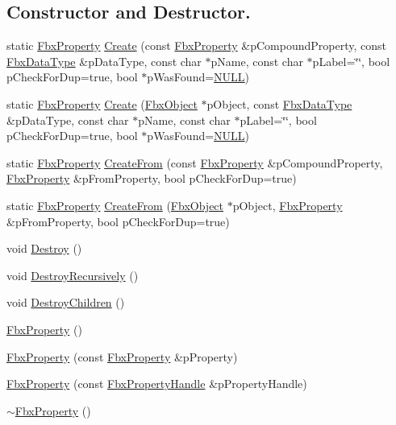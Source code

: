 \subsection*{Constructor and Destructor.}
\begin{DoxyCompactItemize}
\item 
static \hyperlink{class_fbx_property}{Fbx\+Property} \hyperlink{class_fbx_property_ae4aff3fdfa579d96a06f3f025d710e36}{Create} (const \hyperlink{class_fbx_property}{Fbx\+Property} \&p\+Compound\+Property, const \hyperlink{class_fbx_data_type}{Fbx\+Data\+Type} \&p\+Data\+Type, const char $\ast$p\+Name, const char $\ast$p\+Label=\char`\"{}\char`\"{}, bool p\+Check\+For\+Dup=true, bool $\ast$p\+Was\+Found=\hyperlink{fbxarch_8h_a070d2ce7b6bb7e5c05602aa8c308d0c4}{N\+U\+LL})
\item 
static \hyperlink{class_fbx_property}{Fbx\+Property} \hyperlink{class_fbx_property_ae08139931825dd529057d67812928622}{Create} (\hyperlink{class_fbx_object}{Fbx\+Object} $\ast$p\+Object, const \hyperlink{class_fbx_data_type}{Fbx\+Data\+Type} \&p\+Data\+Type, const char $\ast$p\+Name, const char $\ast$p\+Label=\char`\"{}\char`\"{}, bool p\+Check\+For\+Dup=true, bool $\ast$p\+Was\+Found=\hyperlink{fbxarch_8h_a070d2ce7b6bb7e5c05602aa8c308d0c4}{N\+U\+LL})
\item 
static \hyperlink{class_fbx_property}{Fbx\+Property} \hyperlink{class_fbx_property_a333f52b93aca2083c6de7541a3911a65}{Create\+From} (const \hyperlink{class_fbx_property}{Fbx\+Property} \&p\+Compound\+Property, \hyperlink{class_fbx_property}{Fbx\+Property} \&p\+From\+Property, bool p\+Check\+For\+Dup=true)
\item 
static \hyperlink{class_fbx_property}{Fbx\+Property} \hyperlink{class_fbx_property_a3a80022746dbee36a37eed53aa19dbe0}{Create\+From} (\hyperlink{class_fbx_object}{Fbx\+Object} $\ast$p\+Object, \hyperlink{class_fbx_property}{Fbx\+Property} \&p\+From\+Property, bool p\+Check\+For\+Dup=true)
\item 
void \hyperlink{class_fbx_property_a868cb14e3bdafc7e6bb68ffcf003f266}{Destroy} ()
\item 
void \hyperlink{class_fbx_property_acd55a5da5402c12716b5dcda32068456}{Destroy\+Recursively} ()
\item 
void \hyperlink{class_fbx_property_a5dbf74ee7ac5ec07d810d24d58c50ead}{Destroy\+Children} ()
\item 
\hyperlink{class_fbx_property_ac6f4561fd451ab81b93de09dd463e356}{Fbx\+Property} ()
\item 
\hyperlink{class_fbx_property_aaff1233681e54f5e8d70e695c2bdd2ca}{Fbx\+Property} (const \hyperlink{class_fbx_property}{Fbx\+Property} \&p\+Property)
\item 
\hyperlink{class_fbx_property_afaf9ebfe81538ea7948fde0d617f3408}{Fbx\+Property} (const \hyperlink{class_fbx_property_handle}{Fbx\+Property\+Handle} \&p\+Property\+Handle)
\item 
\hyperlink{class_fbx_property_aabd3a3fc65f04824f033844223735139}{$\sim$\+Fbx\+Property} ()
\end{DoxyCompactItemize}
